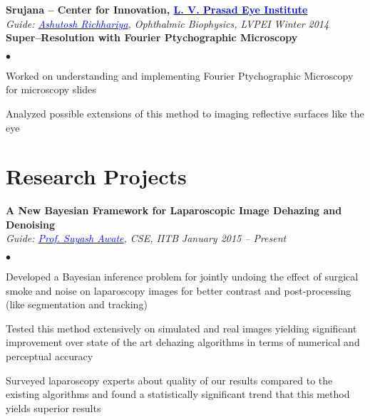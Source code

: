 \documentclass[margin,line]{res}
\newenvironment{list2}{
  \begin{list}{$\bullet$}{%
      \setlength{\itemsep}{0in}
      \setlength{\parsep}{0in} \setlength{\parskip}{0in}
      \setlength{\topsep}{0in} \setlength{\partopsep}{0in} 
      \setlength{\leftmargin}{0.18in}}}{\end{list}}
\begin{document}
\begin{resume}
\vspace*{-0.13in}

{\bf Srujana -- Center for Innovation, \href{http://www.lvpei.org/}{\textcolor{blue}{L. V. Prasad Eye Institute}}} \\
{\em Guide: \href{http://www.lvpei.org/our-team/our-team-ashutosh.php}{\textcolor{blue}{Ashutosh Richhariya}}, Ophthalmic Biophysics, LVPEI} \hfill {\it Winter 2014} \\
\vspace*{-.13in}
\textbf{Super--Resolution with Fourier Ptychographic Microscopy} \\
\begin{list2}
\item Worked on understanding and implementing Fourier Ptychographic Microscopy for microscopy slides
\item Analyzed possible extensions of this method to imaging reflective surfaces like the eye
\end{list2}

\vspace*{-0.13in}

\section{\sc Research Projects}

{\bf A New Bayesian Framework for Laparoscopic Image Dehazing and Denoising} \\
{\em Guide: \href{https://www.cse.iitb.ac.in/~suyash}{\textcolor{blue}{Prof. Suyash Awate}}, CSE, IITB} \hfill {\it January 2015 -- Present} \\
\vspace*{-.13in}
\begin{list2}
\item Developed a Bayesian inference problem for jointly undoing the effect of surgical smoke and noise on laparoscopy images for better contrast and post-processing (like segmentation and tracking)
\item Tested this method extensively on simulated and real images yielding significant improvement over state of the art dehazing algorithms in terms of numerical and perceptual accuracy
\item Surveyed laparoscopy experts about quality of our results compared to the existing algorithms and found a statistically significant trend that this method yields superior results
\end{list2}

\vspace*{-0.13in}


\end{resume}
\end{document}
